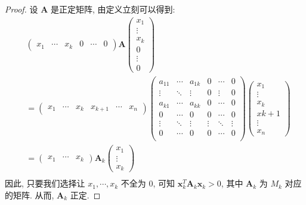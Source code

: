 \documentclass[UTF8]{book}
\begin{document}
\begin{proof}
    设 $\boldsymbol{A}$ 是正定矩阵, 由定义立刻可以得到: 
    $$
    \begin{aligned}
    &\begin{pmatrix}
        x_1 & \cdots & x_k & 0 &\cdots & 0
    \end{pmatrix}
    \boldsymbol{A}
    \begin{pmatrix}
        x_1 \\ \vdots \\ x_k \\ 0 \\\vdots \\ 0
    \end{pmatrix} \\
    &=
    \begin{pmatrix}
        x_1 & \cdots & x_k & x_{k+1} &\cdots & x_n
    \end{pmatrix}
    \begin{pmatrix}
        a_{11}& \cdots & a_{1k} & 0 & \cdots & 0 \\
        \vdots & \ddots & \vdots & 0 & \vdots & 0 \\
        a_{k1}& \cdots & a_{kk} & 0 & \cdots & 0 \\
        0 & \cdots & 0 & 0 & \cdots & 0 \\ 
        \vdots & \ddots & \vdots & \vdots & \ddots & \vdots \\
        0 & \cdots & 0 & 0 & \cdots & 0 \\ 
    \end{pmatrix}
    \begin{pmatrix}
        x_1 \\ \vdots \\ x_k \\ x{k+1} \\\vdots \\ x_n
    \end{pmatrix}\\
    & = 
    \begin{pmatrix}
        x_1 & \cdots & x_k 
    \end{pmatrix}
    \boldsymbol{A}_k
    \begin{pmatrix}
        x_1 \\ \vdots \\ x_k 
    \end{pmatrix} \\
\end{aligned}
    $$
    因此, 只要我们选择让 $x_1,\cdots,x_k$ 不全为 0, 
    可知 $\boldsymbol{x}_k^T \boldsymbol{A}_k \boldsymbol{x}_k>0$, 
    其中 $\boldsymbol{A}_k$ 为 $M_k$ 对应的矩阵. 
    从而, $\boldsymbol{A}_k$ 正定. 


\end{proof}
\end{document}
